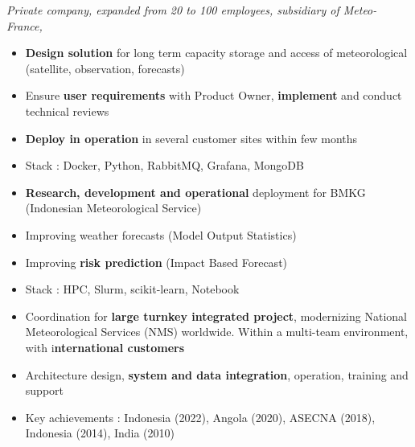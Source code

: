 \documentclass[10pt,a4paper,ragged2e,withhyper]{altacv}
\begin{document}
\begin{paracol}{2}



\textit{
Private company, expanded from 20 to 100 employees, subsidiary of Meteo-France,
}

\medskip
{}
\begin{itemize}
\item \textbf{Design solution} for long term capacity storage and access of meteorological (satellite, observation, forecasts)
\item Ensure \textbf{user requirements} with Product Owner, \textbf{implement} and conduct technical reviews
\item \textbf{Deploy in operation} in several customer sites within few months
\item Stack : Docker, Python, RabbitMQ, Grafana, MongoDB
\end{itemize}

\divider

\begin{itemize}
\item \textbf{Research, development and operational} deployment for BMKG (Indonesian Meteorological Service)
\item Improving weather forecasts (Model Output Statistics)
\item Improving \textbf{risk prediction} (Impact Based Forecast)
\item Stack : HPC, Slurm, scikit-learn, Notebook
\end{itemize}

\divider

\begin{itemize}
\item Coordination for \textbf{large turnkey integrated project}, modernizing National Meteorological Services (NMS) worldwide. Within a multi-team environment, with i\textbf{nternational customers}
\item Architecture design, \textbf{system and data integration}, operation, training and support
\item Key achievements : Indonesia (2022), Angola (2020), ASECNA (2018), Indonesia (2014), India (2010)
\end{itemize}


\end{paracol}
\end{document}

